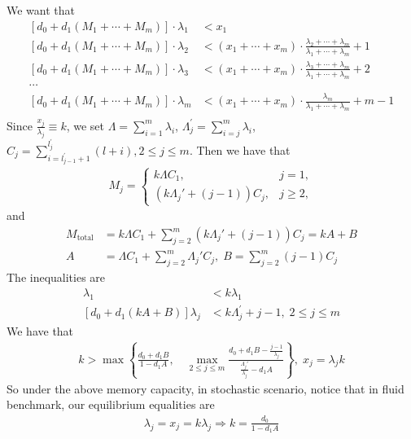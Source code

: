 \documentclass[opre, nonblindrev]{informs3} %
\begin{document}
We want that 
\begin{align*}
\left[d_0+d_1(M_1+\cdots+M_m)\right]\cdot \lambda_1&<x_1\\
\left[d_0+d_1(M_1+\cdots+M_m)\right]\cdot \lambda_2&<(x_1+\cdots+x_m)\cdot \frac{\lambda_2+\cdots+\lambda_m}{\lambda_1+\cdots+\lambda_m}+1 \\
\left[d_0+d_1(M_1+\cdots+M_m)\right]\cdot \lambda_3&<(x_1+\cdots+x_m)\cdot \frac{\lambda_3+\cdots+\lambda_m}{\lambda_1+\cdots+\lambda_m}+2 \\
\cdots&\\
\left[d_0+d_1(M_1+\cdots+M_m)\right]\cdot \lambda_m&<(x_1+\cdots+x_m)\cdot \frac{\lambda_m}{\lambda_1+\cdots+\lambda_m}+m-1 \\
\end{align*}
Since $\frac{x_j}{\lambda_j}\equiv k$, we set $\Lambda = \sum_{i=1}^m \lambda_i$, $\Lambda_j^{\prime}=\sum_{i=j}^m \lambda_i$, $C_j=\sum_{i=l_{j-1}^{\prime}+1}^{l_j^{\prime}}(l+i), 2\leq j\leq m$. Then we have that
\begin{align*}
    M_j = \begin{cases}
k \Lambda C_1, & j=1, \\
\left( k \Lambda_j' + (j-1) \right) C_j, & j \geq 2,
\end{cases}
\end{align*}
and 
\begin{align*}
M_{\text{total}} &= k \Lambda C_1 + \sum_{j=2}^m \left( k \Lambda_j' + (j-1) \right) C_j=kA+B\\
A& = \Lambda C_1 + \sum_{j=2}^m \Lambda_j' C_j,\;B = \sum_{j=2}^m (j-1) C_j
\end{align*}
The inequalities are
\begin{align*}
    [d_0+d_1(kA+B)]\lambda_1&<k\lambda_1\\
[d_0+d_1(kA+B)]\lambda_j&<k\Lambda_j^{\prime}+j-1,\;2\leq j\leq m
\end{align*}
We have that
\begin{align*}
k > \max\left\{ 
\frac{d_0 + d_1 B}{1 - d_1 A}, \quad 
\max_{2\leq j \leq m} \frac{d_0 + d_1 B  - \frac{j-1}{\lambda_j}}{\frac{\Lambda_j'}{\lambda_j} - d_1 A } 
\right\},\; x_j = \lambda_j k
\end{align*}
So under the above memory capacity, in stochastic scenario, notice that in fluid benchmark, our equilibrium equalities are
\begin{align*}
    [d_0+d_1kA]\lambda_j=x_j=k\lambda_j\Rightarrow k=\frac{d_0}{1-d_1A}
\end{align*}
\end{document}
